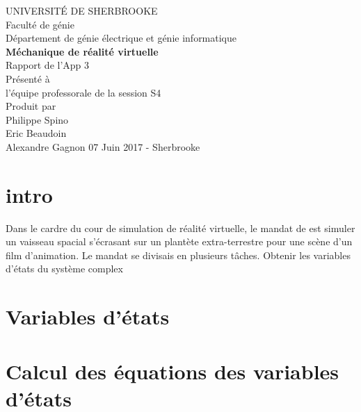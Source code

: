 \documentclass{article}
\begin{document}
\begin{titlepage}   
	\large{
		\begin{center}
			UNIVERSITÉ DE SHERBROOKE\\Faculté de génie\\
			Département de génie électrique et génie informatique\\
			\vspace{3cm}
			{\LARGE\textbf{Méchanique de réalité virtuelle}}\\
			\vspace{2cm}
			\LARGE{Rapport de l'App 3}\\
			\vspace{2cm}
			Présenté à\\l'équipe professorale de la session S4\\
			\vspace{2cm}
			Produit par\\Philippe Spino\\ Eric Beaudoin \\ Alexandre Gagnon
			\vspace{1cm}
			\vfill{07 Juin 2017 - Sherbrooke}
		\end{center}
	}
\end{titlepage}
\section{intro}
\noindent
Dans le cardre du cour de simulation de réalité virtuelle, le mandat de est simuler un vaisseau spacial s'écrasant sur un plantète extra-terrestre pour une scène d'un film d'animation. Le mandat se divisais en plusieurs tâches. Obtenir les variables d'états du système complex 
\section{Variables d'états}
\section{Calcul des équations des variables d'états }
\end{document}

